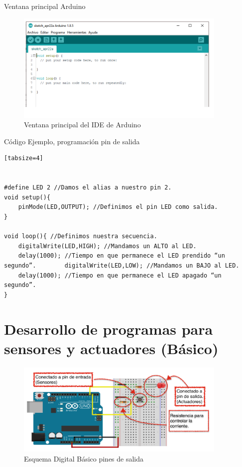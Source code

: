 \documentclass{beamer}
\begin{document}
\begin{frame}{Ventana principal Arduino}


\begin{figure}
\centering
\includegraphics[width=0.9\textwidth]{figures/arduinoide.png}
\caption{Ventana principal del IDE de Arduino}
\end{figure}

\end{frame}


\begin{frame}[fragile]
{Código Ejemplo, programación pin de salida}
\tiny
\begin{verbatim}[tabsize=4]


#define LED 2 //Damos el alias a nuestro pin 2.
void setup(){
	pinMode(LED,OUTPUT); //Definimos el pin LED como salida. 
}

void loop(){ //Definimos nuestra secuencia.
	digitalWrite(LED,HIGH); //Mandamos un ALTO al LED.
	delay(1000); //Tiempo en que permanece el LED prendido “un segundo”. 		digitalWrite(LED,LOW); //Mandamos un BAJO al LED.
	delay(1000); //Tiempo en que permanece el LED apagado “un segundo”. 
}

\end{verbatim}
\end{frame}

\section{Desarrollo de programas para sensores y actuadores (Básico)}

\begin{frame}


\begin{figure}
\centering
\includegraphics[width=0.9\textwidth]{figures/esquemaiodigital.png}
\caption{Esquema Digital Básico pines de salida}
\end{figure}



\end{frame}
\end{document}
